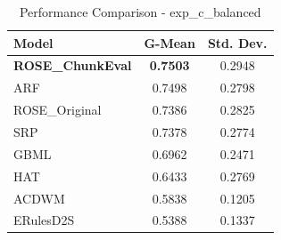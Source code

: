 \begin{table}[htbp]
\centering
\caption{Performance Comparison - exp_c_balanced}
\label{tab:performance_exp_c_balanced}
\begin{tabular}{lcc}
\toprule
Model & G-Mean & Std. Dev. \\
\midrule
\textbf{ROSE_ChunkEval} & \textbf{0.7503} & 0.2948 \\
ARF & 0.7498 & 0.2798 \\
ROSE_Original & 0.7386 & 0.2825 \\
SRP & 0.7378 & 0.2774 \\
GBML & 0.6962 & 0.2471 \\
HAT & 0.6433 & 0.2769 \\
ACDWM & 0.5838 & 0.1205 \\
ERulesD2S & 0.5388 & 0.1337 \\
\bottomrule
\end{tabular}
\end{table}